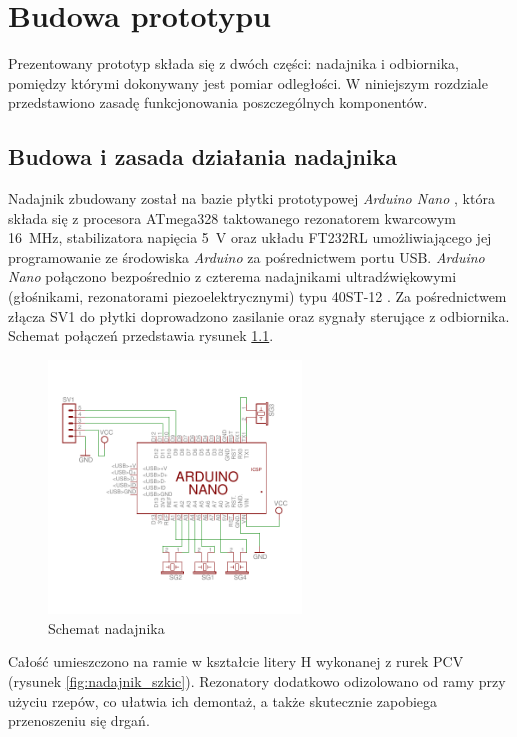 
\chapter{Budowa prototypu}

Prezentowany prototyp składa się z dwóch części: nadajnika i odbiornika, pomiędzy którymi
dokonywany jest pomiar odległości. W niniejszym rozdziale przedstawiono zasadę funkcjonowania 
poszczególnych komponentów.

\section{Budowa i zasada działania nadajnika}

Nadajnik zbudowany został na bazie płytki prototypowej \textit{Arduino Nano} \cite{bib:arduinoNano},
która składa się z procesora ATmega328 \cite{bib:atmega328} taktowanego rezonatorem kwarcowym \SI{16}{MHz},
stabilizatora napięcia \SI{5}{V} oraz układu FT232RL umożliwiającego 
jej programowanie  ze środowiska \textit{Arduino} \cite{bib:Arduino} za pośrednictwem portu USB. 
\textit{Arduino Nano} połączono 
bezpośrednio z czterema nadajnikami ultradźwiękowymi (głośnikami, rezonatorami piezoelektrycznymi) typu 40ST-12 \cite{bib:40ST12}.
Za pośrednictwem złącza SV1 do płytki doprowadzono zasilanie oraz sygnały sterujące z odbiornika. 
Schemat połączeń przedstawia rysunek \ref{fig:nadajnik_schemat}.

 \begin{figure}[h]
    \centering
    \includegraphics[width=0.6\textwidth, trim= 0mm 0mm 0mm 0mm,clip]{transmitter}
    \caption{Schemat nadajnika}
    \label{fig:nadajnik_schemat}
\end{figure}

Całość umieszczono na ramie w kształcie litery H wykonanej z rurek PCV (rysunek \ref{fig:nadajnik_szkic}).
Rezonatory dodatkowo odizolowano  od ramy przy użyciu rzepów, co ułatwia ich demontaż, a także skutecznie
zapobiega przenoszeniu się drgań. 

